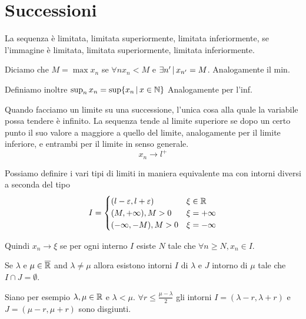 \documentclass[a4paper]{article}
\begin{document}
\pagebreak

\section{Successioni}

\begin{radioactive}
La sequenza è limitata, limitata superiormente, limitata inferiormente,
se l'immagine è limitata, limitata superiormente, limitata inferiormente.

Diciamo che \(M=\max x_n\) se \(\forall n x_n < M\) e \(\exists n' \,|\, x_{n'} = M\).
Analogamente il min.

Definiamo inoltre \(\sup_{n} x_n = \sup \{ x_n \,|\, x \in \mathbb{N} \}\)
Analogamente per l'inf.

Quando facciamo un limite su una successione, l'unica cosa alla quale la variabile possa
tendere è infinito.
La sequenza tende al limite superiore se dopo un certo punto il suo valore a maggiore a quello del limite,
analogamente per il limite inferiore, e entrambi per il limite in senso generale.
\[
    x_n \to l^+
\]

Possiamo definire i vari tipi di limiti in maniera equivalente ma
con intorni diversi a seconda del tipo
\[
    I = \begin{cases}
        (l-\varepsilon, l+\varepsilon) & \xi \in \mathbb{R} \\
        (M, +\infty), M > 0 & \xi = +\infty \\
        (-\infty, -M), M > 0 & \xi = -\infty
    \end{cases}
\]

Quindi \(x_n \to \xi\) se per ogni interno \(I\) esiste \(N\) tale che \(\forall n \geq N, x_n \in I\).

\begin{snippetlemma}{}
    Se \(\lambda\) e \(\mu \in \overline{\mathbb{R}}\) and \(\lambda \neq \mu\)
    allora esistono intorni \(I\) di \(\lambda\) e \(J\) intorno di \(\mu\)
    tale che \(I \cap J = \emptyset\).
\end{snippetlemma}

\begin{snippetproof}{}
    Siano per esempio \(\lambda, \mu \in \mathbb{R}\) e \(\lambda < \mu\).
    \(\forall r \leq \frac{\mu - \lambda}{2}\) gli intorni \(I = (\lambda - r, \lambda + r)\)
    e \(J = (\mu - r, \mu + r)\) sono disgiunti.
\end{snippetproof}
\end{radioactive}
\end{document}

